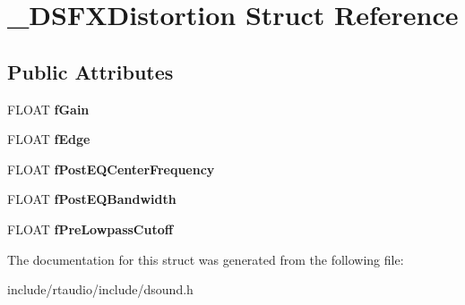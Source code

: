 \hypertarget{struct___d_s_f_x_distortion}{}\section{\+\_\+\+D\+S\+F\+X\+Distortion Struct Reference}
\label{struct___d_s_f_x_distortion}
\subsection*{Public Attributes}
\begin{DoxyCompactItemize}
\item 
F\+L\+O\+AT {\bfseries f\+Gain}\hypertarget{struct___d_s_f_x_distortion_abb63f842f0ecba5633e5824c73feef15}{}\label{struct___d_s_f_x_distortion_abb63f842f0ecba5633e5824c73feef15}

\item 
F\+L\+O\+AT {\bfseries f\+Edge}\hypertarget{struct___d_s_f_x_distortion_a3c222ef66690aae3fd427172d757cde5}{}\label{struct___d_s_f_x_distortion_a3c222ef66690aae3fd427172d757cde5}

\item 
F\+L\+O\+AT {\bfseries f\+Post\+E\+Q\+Center\+Frequency}\hypertarget{struct___d_s_f_x_distortion_a42b810b13b35561a497c9c1c81fb9ae1}{}\label{struct___d_s_f_x_distortion_a42b810b13b35561a497c9c1c81fb9ae1}

\item 
F\+L\+O\+AT {\bfseries f\+Post\+E\+Q\+Bandwidth}\hypertarget{struct___d_s_f_x_distortion_a7936398b902ff14fcddd4c1ab2570f54}{}\label{struct___d_s_f_x_distortion_a7936398b902ff14fcddd4c1ab2570f54}

\item 
F\+L\+O\+AT {\bfseries f\+Pre\+Lowpass\+Cutoff}\hypertarget{struct___d_s_f_x_distortion_ab41d304a76a207742de393707781afa5}{}\label{struct___d_s_f_x_distortion_ab41d304a76a207742de393707781afa5}

\end{DoxyCompactItemize}


The documentation for this struct was generated from the following file\+:\begin{DoxyCompactItemize}
\item 
include/rtaudio/include/dsound.\+h\end{DoxyCompactItemize}
